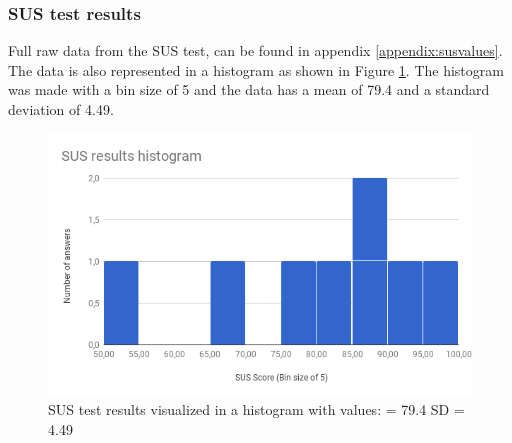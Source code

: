 \subsubsection{SUS test results}
Full raw data from the SUS test, can be found in appendix \ref{appendix:susvalues}. The data is also represented in a histogram as shown in Figure \ref{fig:histogram}. The histogram was made with a bin size of 5 and the data has a mean of 79.4 and a standard deviation of 4.49.

\begin{figure}[H]
    \centering
    \includegraphics[width=0.75\linewidth]{InteraktionsDesign/Assets/Resultater/histogram_new.png}
    \caption{SUS test results visualized in a histogram with values:
        \mu  = 79.4  \newline SD = 4.49}
    \label{fig:histogram}
\end{figure}




